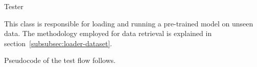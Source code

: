 \begin{section}{Tester}
    \par This class is responsible for loading and running a pre-trained model on unseen data. The methodology employed for data retrieval is explained in section~\ref{subsubsec:loader-dataset}.
    \par Pseudocode of the test flow follows.
    
\end{section}